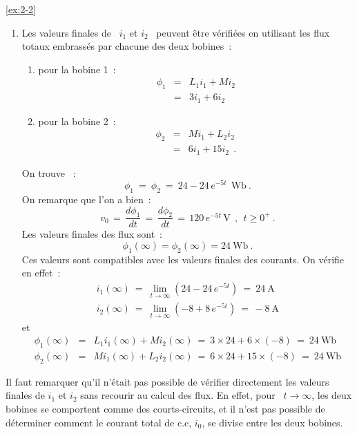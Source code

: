 \begin{solexercise}{\ref{ex:2-2}}
\begin{enumerate}
	\item Les valeurs finales de \ $i_1$ et $i_2$ \ peuvent être vérifiées
	en utilisant les flux totaux embrassés par chacune des deux bobines~:
	\begin{enumerate}
		\item pour la bobine 1~: 
		\begin{eqnarray*}
			\phi_1 &=& L_1i_1 + Mi_2\\
			&=& 3i_1 + 6i_2 
		\end{eqnarray*}
		\item pour la bobine 2~: 
		\begin{eqnarray*}
			\phi_2 &=& Mi_1 + L_2i_2\\
			&=& 6i_1 + 15i_2 ~~.
		\end{eqnarray*}
	\end{enumerate}
	On trouve ~:
	\[ \phi_1 \: = \: \phi_2 \: = \: 24 - 24\, e^{-5t}~~\mbox{Wb}~. \]
	On remarque que l'on a bien~:
	\[ v_0 \, = \, \dfrac{d\phi_1}{dt} \, = \, \dfrac{d\phi_2}{dt} 
	\, = \, 120\, e^{-5t} \, \text{V}~~, ~~t\geq 0^+~. \]
	Les valeurs finales des flux sont~: 
	\[ \phi_1(\infty ) = \phi_2(\infty ) = 24~\mbox{Wb}~. \]
	Ces valeurs sont compatibles avec les valeurs finales des courants. On vérifie en effet~: 
	\begin{eqnarray*}
		i_1(\infty ) \: = \: \lim_{t\rightarrow\infty} \left( 24-24\, e^{-5t} \right) \: = \: 24~\mbox{A}\\
		i_2(\infty ) \: = \: \lim_{t\rightarrow\infty} \left( -8+8\, e^{-5t} \right) \: = \, - 8~\mbox{A}
	\end{eqnarray*}
	et
	\begin{eqnarray*}
		\phi_1(\infty )  &=& L_1i_1(\infty ) + Mi_2(\infty ) \: 
		= \: 3\times 24 + 6\times (-8) \: = \: 24~\mbox{Wb}\\
		\phi_2(\infty )  &=& Mi_1(\infty ) + L_2i_2(\infty ) \: 
		= \: 6\times 24 + 15\times (-8) \: = \: 24~\mbox{Wb}
	\end{eqnarray*}
\end{enumerate}

Il faut remarquer qu'il n'était pas possible de vérifier directement les valeurs finales de $ i_1$ et $i_2$ sans recourir au calcul des flux. En effet, pour \ $t\rightarrow\infty$, les deux bobines se comportent comme
des courts-circuits, et il n'est pas possible de déterminer comment le courant total de c.c, $i_0$, se divise entre les deux bobines.

\end{solexercise}